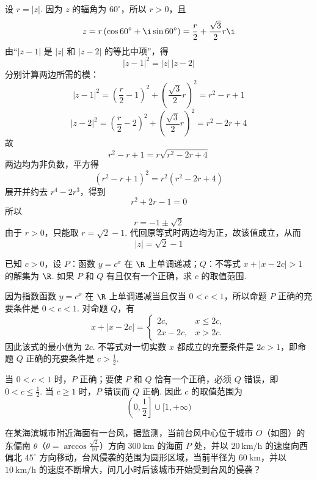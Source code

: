 \begin{solution}
设 \(r=|z|\). 因为 \(z\) 的辐角为 \(60^{\circ}\)，所以 \(r>0\)，且
\[
z=r\left(\cos60^{\circ}+\i\sin60^{\circ}\right)
=\frac r2+\frac{\sqrt3}{2}r\i
\]
由“\(|z-1|\) 是 \(|z|\) 和 \(|z-2|\) 的等比中项”，得
\[
|z-1|^{2}=|z|\,|z-2|
\]
分别计算两边所需的模：
\[
|z-1|^{2}=\left(\frac r2-1\right)^{2}+\left(\frac{\sqrt3}{2}r\right)^{2}
=r^{2}-r+1
\]
\[
|z-2|^{2}=\left(\frac r2-2\right)^{2}+\left(\frac{\sqrt3}{2}r\right)^{2}
=r^{2}-2r+4
\]
故
\[
r^{2}-r+1=r\sqrt{r^{2}-2r+4}
\]
两边均为非负数，平方得
\[
(r^{2}-r+1)^{2}=r^{2}(r^{2}-2r+4)
\]
展开并约去 \(r^{4}-2r^{3}\)，得到
\[
r^{2}+2r-1=0
\]
所以
\[
r=-1\pm\sqrt2
\]
由于 \(r>0\)，只能取 \(r=\sqrt2-1\). 代回原等式时两边均为正，故该值成立，从而
\[
|z|=\sqrt2-1
\]
\end{solution}

\begin{problem}
已知 \(c > 0\)，设 \(P\)：函数 \(y = c^{x}\) 在 \(\R\) 上单调递减；\(Q\)：不等式 \(x + |x - 2c| > 1\) 的解集为 \(\R\). 如果 \(P\) 和 \(Q\) 有且仅有一个正确，求 \(c\) 的取值范围.
\end{problem}

\begin{solution}
因为指数函数 \(y=c^{x}\) 在 \(\R\) 上单调递减当且仅当 \(0<c<1\)，所以命题 \(P\) 正确的充要条件是 \(0<c<1\). 对命题 \(Q\)，有
\[
x+|x-2c|=
\begin{cases}
2c, & x\leqslant2c,\\
2x-2c, & x>2c.
\end{cases}
\]
因此该式的最小值为 \(2c\). 不等式对一切实数 \(x\) 都成立的充要条件是 \(2c>1\)，即命题 \(Q\) 正确的充要条件是 \(c>\frac12\).

当 \(0<c<1\) 时，\(P\) 正确；要使 \(P\) 和 \(Q\) 恰有一个正确，必须 \(Q\) 错误，即 \(0<c\leqslant\frac12\). 当 \(c\geqslant1\) 时，\(P\) 错误而 \(Q\) 正确. 因此 \(c\) 的取值范围为
\[
\left(0,\frac12\right]\cup[1,+\infty)
\]
\end{solution}

\begin{problem}
在某海滨城市附近海面有一台风，据监测，当前台风中心位于城市 \(O\)（如图）的东偏南 \(\theta\)（\(\theta = \arccos \frac{\sqrt{2}}{10}\)）方向 \(300 \mathrm{~km}\) 的海面 \(P\) 处，并以 \(20 \mathrm{~km}/\mathrm{h}\) 的速度向西偏北 \(45^{\circ}\) 方向移动，台风侵袭的范围为圆形区域，当前半径为 \(60 \mathrm{~km}\)，并以 \(10 \mathrm{~km}/\mathrm{h}\) 的速度不断增大，问几小时后该城市开始受到台风的侵袭？

\end{problem}

